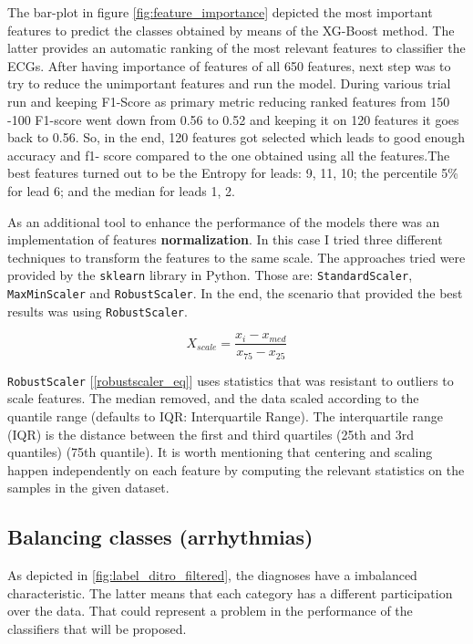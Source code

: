 The bar-plot in figure \ref{fig:feature_importance} depicted the most important features to predict the classes obtained by means of the XG-Boost method. The latter provides an automatic ranking of the most relevant features to classifier the ECGs. After having importance of features of all 650 features, next step was to try to reduce the unimportant features and
run the model. During various trial run and keeping F1-Score as primary metric reducing ranked features from 150 -100 F1-score went down from 0.56 to 0.52 and keeping it on 120 features it goes back to 0.56. So, in the end, 120 features got selected which leads to good enough accuracy and f1-
score compared to the one obtained using all the features.The best features turned out to be the Entropy for leads: 9, 11, 10; the percentile 5\% for lead 6; and the median for leads 1, 2.

As an additional tool to enhance the performance of the models there was an implementation of features \textbf{normalization}. In this case I tried three different techniques to transform the features to the same scale. The approaches tried were provided by the \texttt{sklearn} library in Python. Those are: \texttt{StandardScaler}, \texttt{MaxMinScaler} and \texttt{RobustScaler}. In the end, the scenario that provided the best results was using \texttt{RobustScaler}. 

\begin{equation} \label{robustscaler_eq}
X_{scale} = \frac{x_i - x_{med}}{x_{75} - x_{25}}
\end{equation}

\texttt{RobustScaler} [\ref{robustscaler_eq}] uses statistics that was resistant to outliers to scale features. The median removed, and the data scaled according to the quantile range (defaults to IQR: Interquartile Range). The interquartile range (IQR) is the distance between the first and third quartiles (25th and 3rd quantiles) (75th quantile). It is worth mentioning that centering and scaling happen independently on each feature by computing the relevant statistics on the samples in the given dataset.

\subsection{Balancing classes (arrhythmias)}

As depicted in \ref{fig:label_ditro_filtered}, the diagnoses have a imbalanced characteristic. The latter means that each category has a different participation over the data. That could represent a problem in the performance of the classifiers that will be proposed.

